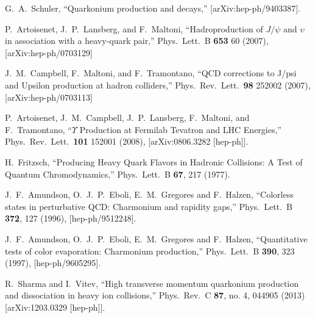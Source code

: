 \documentclass[aps,prc,preprint,superscriptaddress,showpacs,showkeys,amsmath]{revtex4-1}
\begin{document}
\begin{thebibliography}{100}
  G.~A.~Schuler,        
  ``Quarkonium production and decays,''
  [arXiv:hep-ph/9403387].


  P.~Artoisenet, J.~P.~Lansberg, and F.~Maltoni,
  ``Hadroproduction of $J/\psi$ and $\upsilon$ in association with a
  heavy-quark pair,''
  Phys.\ Lett.\  B {\bf 653} 60 (2007),
  [arXiv:hep-ph/0703129]


  J.~M.~Campbell, F.~Maltoni, and F.~Tramontano,
  ``QCD corrections to J/psi and Upsilon production at hadron colliders,''
  Phys.\ Rev.\ Lett.\  {\bf 98} 252002 (2007),
  [arXiv:hep-ph/0703113]


  P.~Artoisenet, J.~M.~Campbell, J.~P.~Lansberg, F.~Maltoni, and F.~Tramontano,
  ``$\Upsilon$ Production at Fermilab Tevatron and LHC Energies,''
  Phys.\ Rev.\ Lett.\  {\bf 101} 152001 (2008),
  [arXiv:0806.3282 [hep-ph]].
  

  H.~Fritzsch,
  ``Producing Heavy Quark Flavors in Hadronic Collisions: A Test of Quantum Chromodynamics,''
  Phys.\ Lett.\ B {\bf 67}, 217 (1977).
  
  J.~F.~Amundson, O.~J.~P.~Eboli, E.~M.~Gregores and F.~Halzen,
  ``Colorless states in perturbative QCD: Charmonium and rapidity gaps,''
  Phys.\ Lett.\ B {\bf 372}, 127 (1996),
  [hep-ph/9512248].


  J.~F.~Amundson, O.~J.~P.~Eboli, E.~M.~Gregores and F.~Halzen,
  ``Quantitative tests of color evaporation: Charmonium production,''
  Phys.\ Lett.\ B {\bf 390}, 323 (1997),
  [hep-ph/9605295].







  R.~Sharma and I.~Vitev,
  ``High transverse momentum quarkonium production and dissociation in heavy ion collisions,''
  Phys.\ Rev.\ C {\bf 87}, no. 4, 044905 (2013)
  [arXiv:1203.0329 [hep-ph]].



\end{thebibliography}
\end{document}

